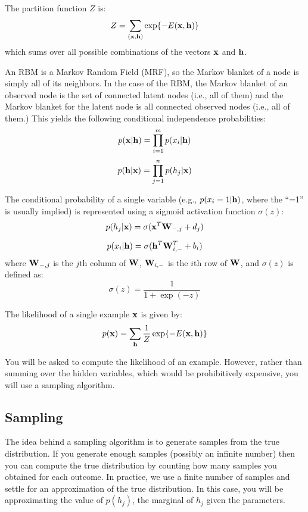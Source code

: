 \documentclass[11pt]{article}
\newcommand{\vx}{{\bf x}}
\newcommand{\vh}{{\bf h}}
\newcommand{\W}{{\bf W}}
\begin{document}
The partition function $Z$ is:
\begin{equation}
Z = \sum_{(\vx,\vh)} \exp\{-E(\vx, \vh)\}
\end{equation}
which sums over all possible combinations of the vectors $\vx$ and $\vh$.

An RBM is a Markov Random Field (MRF), so the Markov blanket of a node is simply all of its neighbors. In the case of the RBM, the Markov blanket of an
observed node is the set of connected latent nodes (i.e., all of them) and the Markov blanket for the latent node is all connected observed nodes (i.e., all of them.)
This yields the following conditional independence probabilities:
\begin{equation}
\label{eq:cond2}
p(\vx|\vh) = \prod_{i=1}^{m} p(x_i|\vh)
\end{equation}
\begin{equation}
\label{eq:cond}
p(\vh|\vx) = \prod_{j=1}^{n} p(h_j|\vx)
\end{equation}

The conditional probability of a single variable (e.g., $p(x_i=1|\vh)$, where the ``=1'' is usually implied) is represented using a sigmoid activation function $\sigma(z)$:
\begin{equation}
\label{eq:phx}
p(h_j|\vx) = \sigma(\vx^T\W_{-,j} + d_j)
\end{equation}

\begin{equation}
\label{eq:pxh}
p(x_i|\vh) = \sigma(\vh^T\W_{i,-}^T + b_i)
\end{equation}
where $\W_{-,j}$ is the $j$th column of $\W$, $\W_{i,-}$ is the $i$th row of $\W$, and $\sigma(z)$ is defined as:
\begin{equation}
\sigma(z) = \frac{1}{1+\exp(-z)}
\end{equation}

The likelihood of a single example $\vx$ is given by:
\begin{equation}
p(\vx) = \sum_{\vh} \frac{1}{Z} \exp\{-E(\vx, \vh)\}
\end{equation}

You will be asked to compute the likelihood of an example. However, rather than summing over the hidden variables, which would be prohibitively expensive,
you will use a sampling algorithm.

\subsection{Sampling}
\label{sec:Sampling} %
The idea behind a sampling algorithm is to generate samples from the true distribution. If you generate enough samples (possibly
an infinite number) then you can compute the true distribution by counting how many samples you obtained for each outcome.
In practice, we use a finite number of samples and settle for an approximation of the true distribution. In this case, you will
be approximating the value of $p(h_j)$, the marginal of $h_j$ given the parameters.
\end{document}
